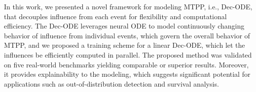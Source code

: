 In this work, we presented a novel framework for modeling MTPP, i.e., Dec-ODE,  
that decouples influence from each event for flexibility and computational efficiency. 
The Dec-ODE leverages neural ODE to model continuously changing behavior of influence from individual events, 
which govern the overall behavior of MTPP, and we proposed a training scheme 
for a linear Dec-ODE, which let the influences be efficiently computed in parallel. 
The proposed method was validated on five real-world benchmarks yielding 
comparable or superior results. 
Moreover, it provides explainability to the modeling,
which suggests significant potential for applications such as out-of-distribution detection and survival analysis. 